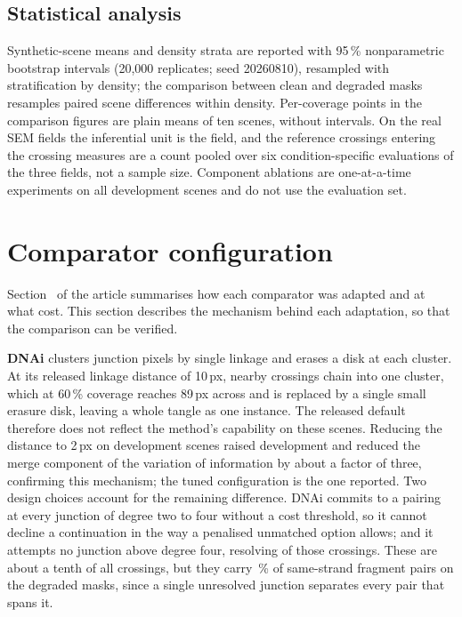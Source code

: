 \subsection{Statistical analysis}

Synthetic-scene means and density strata are reported with 95\,\%
nonparametric bootstrap intervals (20,000 replicates; seed 20260810),
resampled with stratification by density; the comparison between clean and
degraded masks resamples paired scene differences within density.
Per-coverage points in the comparison figures are plain means of ten scenes,
without intervals. On the real SEM fields the inferential unit is the field,
and the \PlectaRealCrossingTotal{} reference crossings entering the crossing
measures are a count pooled over six condition-specific evaluations of the
three fields, not a sample size. Component ablations are one-at-a-time
experiments on all \PlectaDevelopmentSceneCount{} development scenes and do
not use the evaluation set.

\section{Comparator configuration}
\label{app:comparators}

Section~ of the article summarises how each
comparator was adapted and at what cost. This section describes the mechanism
behind each adaptation, so that the comparison can be verified.

\textbf{DNAi} clusters junction pixels by single linkage and erases a disk at
each cluster. At its released linkage distance of 10\,px, nearby crossings
chain into one cluster, which at 60\,\% coverage reaches 89\,px across and is
replaced by a single small erasure disk, leaving a whole tangle as one
instance. The released default therefore does not reflect the method's
capability on these scenes. Reducing the distance to 2\,px on development
scenes raised development \Fone{} and reduced the merge component of the
variation of information by about a factor of three, confirming this
mechanism; the tuned configuration is the one reported. Two design choices
account for the remaining difference. DNAi commits to a pairing at every
junction of degree two to four without a cost threshold, so it cannot decline
a continuation in the way a penalised unmatched option allows; and it attempts
no junction above degree four, resolving
\PlectaJunctionDNAiDegreeFivePlus{} of those crossings. These are about a
tenth of all crossings, but they carry \PlectaEvidenceHighDegree{}\,\% of
same-strand fragment pairs on the degraded masks, since a single unresolved
junction separates every pair that spans it.

